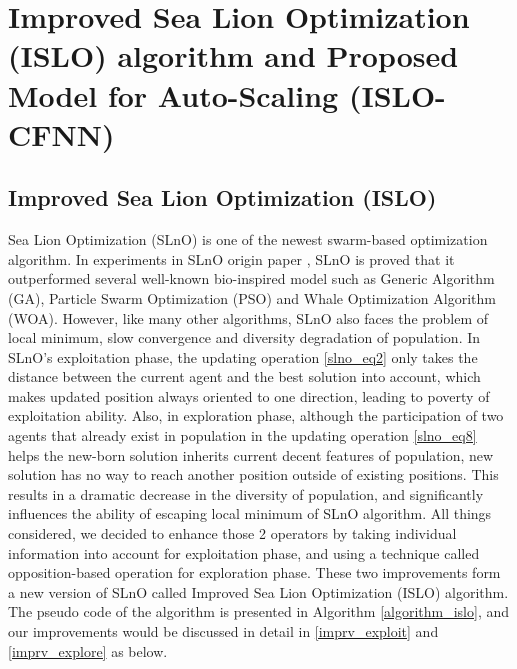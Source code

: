 \documentclass[a4paper,13pt,2p]{report}
\begin{document}
\chapter{Improved Sea Lion Optimization (ISLO) algorithm and Proposed Model for Auto-Scaling (ISLO-CFNN)}
\section{Improved Sea Lion Optimization (ISLO)}
\label{improved_ISLO}
	Sea Lion Optimization (SLnO) is one of the newest swarm-based optimization algorithm. In experiments in SLnO origin paper \cite{masadeh2019sea}, SLnO is proved that it outperformed several well-known bio-inspired model such as Generic Algorithm (GA), Particle Swarm Optimization (PSO) and Whale Optimization Algorithm (WOA). However, like many other algorithms, SLnO also faces the problem of local minimum, slow convergence and diversity degradation of population. In SLnO's exploitation phase, the updating operation \ref{slno_eq2} only takes the distance between the current agent and the best solution into account, which makes updated position always oriented to one direction, leading to poverty of exploitation ability. Also, in exploration phase, although the participation of two agents that already exist in population in the updating operation \ref{slno_eq8} helps the new-born solution inherits current decent features of population, new solution has no way to reach another position outside of existing positions. This results in a dramatic decrease in the diversity of population, and significantly influences the ability of escaping local minimum of SLnO algorithm. All things considered, we decided to enhance those 2 operators by taking individual information into account for exploitation phase, and using a technique called opposition-based operation for exploration phase. These two improvements form a new version of SLnO called Improved Sea Lion Optimization (ISLO) algorithm. The pseudo code of the algorithm is presented in Algorithm \ref{algorithm_islo}, and  our improvements would be discussed in detail in \ref{imprv_exploit} and \ref{imprv_explore} as below.  
\end{document}
